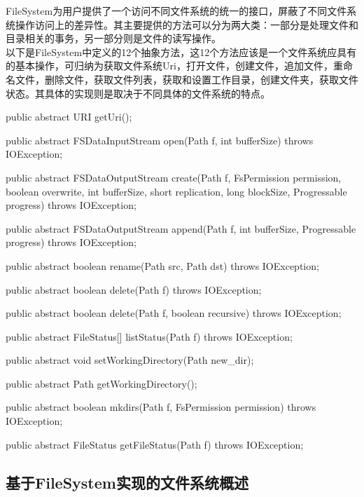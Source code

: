     FileSystem为用户提供了一个访问不同文件系统的统一的接口，屏蔽了不同文件系统操作访问上的差异性。其主要提供的方法可以分为两大类：一部分是处理文件和目录相关的事务，另一部分则是文件的读写操作。\\
    以下是FileSystem中定义的12个抽象方法，这12个方法应该是一个文件系统应具有的基本操作，可归纳为获取文件系统Uri，打开文件，创建文件，追加文件，重命名文件，删除文件，获取文件列表，获取和设置工作目录，创建文件夹，获取文件状态。其具体的实现则是取决于不同具体的文件系统的特点。
    \begin{java}[caption=FileSystem abstract method]
public abstract URI getUri();

public abstract FSDataInputStream open(Path f, int bufferSize) throws IOException;

public abstract FSDataOutputStream create(Path f,
    FsPermission permission,
    boolean overwrite,
    int bufferSize,
    short replication,
    long blockSize,
    Progressable progress) throws IOException;

public abstract FSDataOutputStream append(Path f, int bufferSize, Progressable progress) throws IOException;

public abstract boolean rename(Path src, Path dst) throws IOException;

public abstract boolean delete(Path f) throws IOException;

public abstract boolean delete(Path f, boolean recursive) throws IOException;

public abstract FileStatus[] listStatus(Path f) throws IOException;

public abstract void setWorkingDirectory(Path new_dir);

public abstract Path getWorkingDirectory();

public abstract boolean mkdirs(Path f, FsPermission permission) throws IOException;

public abstract FileStatus getFileStatus(Path f) throws IOException;

    \end{java}

\subsection{基于FileSystem实现的文件系统概述}

